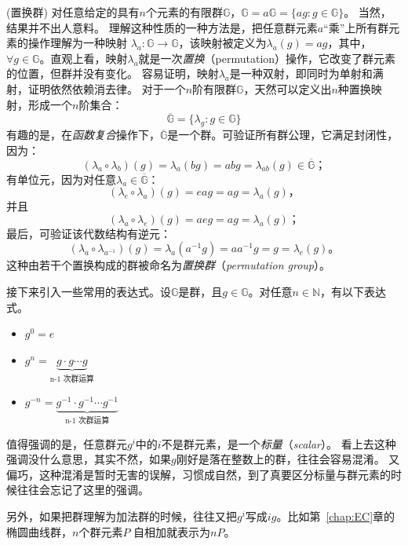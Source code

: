 \begin{example}{(置换群)}
\label{exm:perm_gr}
对任意给定的具有$n$个元素的有限群$ \mathbb{G}$，$ \mathbb{G} = a \mathbb{G} = \{a g : g \in \mathbb{G} \} $。
当然，结果并不出人意料。
理解这种性质的一种方法是，把任意群元素$a$“乘”上所有群元素的操作理解为一种映射
$\lambda_a\colon \mathbb{G}  \to \mathbb{G}$，该映射被定义为$\lambda_a(g) = a g$，其中，
$\forall g \in \mathbb{G} $。直观上看，映射$\lambda_a$就是一次\emph{置换}（permutation）操作，它改变了群元素的位置，但群并没有变化。
容易证明，映射$\lambda_a$是一种双射，即同时为单射和满射，证明依然依赖消去律。
对于一个$n$阶有限群$ \mathbb{G}$，天然可以定义出$n$种置换映射，形成一个$n$阶集合：
\[ \overline{\mathbb{G}} = \{ \lambda_g: g \in \mathbb{G} \}\]
有趣的是，在\emph{函数复合}操作下，$\overline{\mathbb{G}} $是一个群。可验证所有群公理，它满足封闭性，因为：
\[ (\lambda_a \circ \lambda_b) (g) = \lambda_a(bg) = abg = \lambda_{ab}(g) \in  \overline{\mathbb{G}} \text{；}\]
有单位元，因为对任意$\lambda_a \in \overline{\mathbb{G}}$：
\[ (\lambda_e \circ \lambda_a)(g) = eag = ag =\lambda_a(g) \text{，}\]
并且
\[ (\lambda_a \circ \lambda_e)(g) = aeg = ag = \lambda_a(g) \text{；}\]
最后，可验证该代数结构有逆元：
\[ (\lambda_a \circ \lambda_{a^{-1}})(g) = \lambda_a(a^{-1}g) = a a^{-1}g = g  = \lambda_e(g) \text{。}\]
这种由若干个置换构成的群被命名为\emph{置换群}（\emph{permutation group}）。
\end{example}

接下来引入一些常用的表达式。设$\mathbb{G}$是群，且$g \in \mathbb{G}$。对任意$n\in \mathbb{N}$，有以下表达式。

    \begin{itemize}
       	\item $g^0 = e$
       	\item $g^n = \underbrace{g\cdot g \cdots g}_{\text{n-1 次群运算}}$
       	\item $g^{-n} = \underbrace{g^{-1}\cdot g^{-1} \cdots g^{-1}}_{\text{n-1 次群运算}}$
    \end{itemize}
    
\begin{remark}
\label{rem:scaler-vs-group-element}
值得强调的是，任意群元$g^i$中的$i$不是群元素，是一个\emph{标量}（\emph{scalar}）。
看上去这种强调没什么意思，其实不然，如果$g$刚好是落在整数上的群，往往会容易混淆。
又偏巧，这种混淆是暂时无害的误解，习惯成自然，到了真要区分标量与群元素的时候往往会忘记了这里的强调。
\end{remark}
另外，如果把群理解为加法群的时候，往往又把$g^i$写成$i g$。比如第~\ref{chap:EC}章的椭圆曲线群，$n$个群元素$P$
自相加就表示为$nP$。

